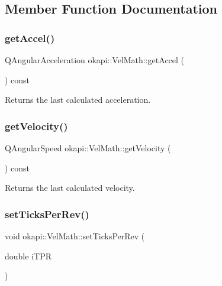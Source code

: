 \subsection{Member Function Documentation}
\mbox{\label{classokapi_1_1VelMath_ac47c50d2fc6035739607801d1aa2272d}} 
\subsubsection{\texorpdfstring{getAccel()}{getAccel()}}
{\footnotesize\ttfamily Q\+Angular\+Acceleration okapi\+::\+Vel\+Math\+::get\+Accel (\begin{DoxyParamCaption}{ }\end{DoxyParamCaption}) const\hspace{0.3cm}{\ttfamily [virtual]}}

Returns the last calculated acceleration. \mbox{\label{classokapi_1_1VelMath_ae366b0895bfac15e986448aa9c22b26c}} 
\subsubsection{\texorpdfstring{getVelocity()}{getVelocity()}}
{\footnotesize\ttfamily Q\+Angular\+Speed okapi\+::\+Vel\+Math\+::get\+Velocity (\begin{DoxyParamCaption}{ }\end{DoxyParamCaption}) const\hspace{0.3cm}{\ttfamily [virtual]}}

Returns the last calculated velocity. \mbox{\label{classokapi_1_1VelMath_a0a95837a35bfb2702a170da95daba559}} 
\subsubsection{\texorpdfstring{setTicksPerRev()}{setTicksPerRev()}}
{\footnotesize\ttfamily void okapi\+::\+Vel\+Math\+::set\+Ticks\+Per\+Rev (\begin{DoxyParamCaption}\item[{double}]{i\+T\+PR }\end{DoxyParamCaption})\hspace{0.3cm}{\ttfamily [virtual]}}

